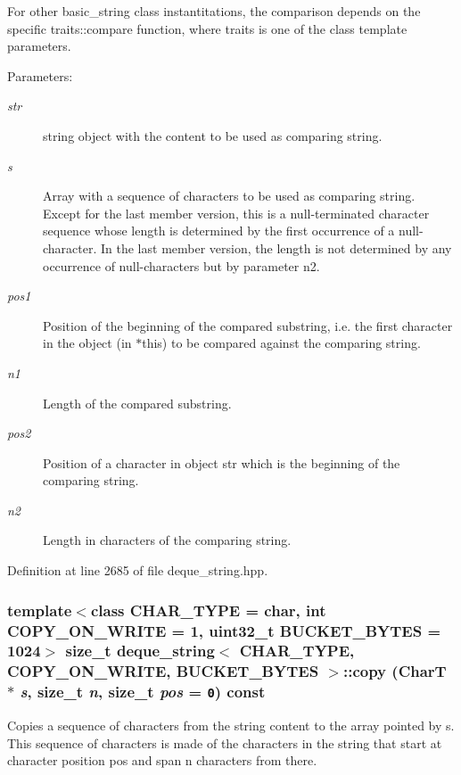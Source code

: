 For other basic\_\-string class instantitations, the comparison depends on the specific traits::compare function, where traits is one of the class template parameters.

\begin{Desc}
\item[Parameters:]
\begin{description}
\item[{\em str}]string object with the content to be used as comparing string. \item[{\em s}]Array with a sequence of characters to be used as comparing string. Except for the last member version, this is a null-terminated character sequence whose length is determined by the first occurrence of a null-character. In the last member version, the length is not determined by any occurrence of null-characters but by parameter n2. \item[{\em pos1}]Position of the beginning of the compared substring, i.e. the first character in the object (in $\ast$this) to be compared against the comparing string. \item[{\em n1}]Length of the compared substring. \item[{\em pos2}]Position of a character in object str which is the beginning of the comparing string. \item[{\em n2}]Length in characters of the comparing string. \end{description}
\end{Desc}


Definition at line 2685 of file deque\_\-string.hpp.\hypertarget{classdeque__string_09f252cc4b51eeae6cb8f2f96795123e}{
\subsubsection[{copy}]{\setlength{\rightskip}{0pt plus 5cm}template$<$class CHAR\_\-TYPE  = char, int COPY\_\-ON\_\-WRITE = 1, uint32\_\-t BUCKET\_\-BYTES = 1024$>$ size\_\-t {\bf deque\_\-string}$<$ CHAR\_\-TYPE, COPY\_\-ON\_\-WRITE, BUCKET\_\-BYTES $>$::copy (CharT $\ast$ {\em s}, \/  size\_\-t {\em n}, \/  size\_\-t {\em pos} = {\tt 0}) const}}
\label{classdeque__string_09f252cc4b51eeae6cb8f2f96795123e}


Copies a sequence of characters from the string content to the array pointed by s. This sequence of characters is made of the characters in the string that start at character position pos and span n characters from there.

